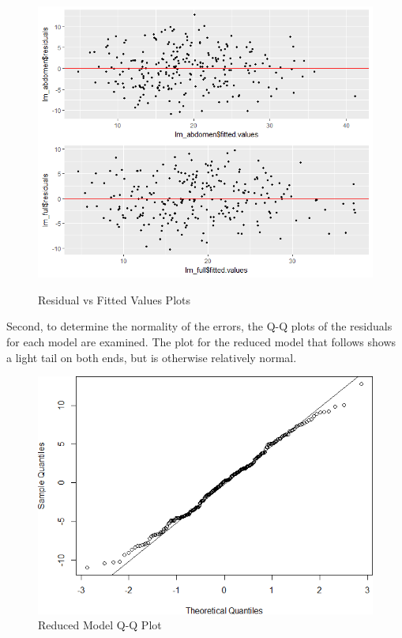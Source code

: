 \documentclass[a4paper, 11pt]{article}
\begin{document}
\begin{figure}[H]
	\centering
	\caption{Residual vs Fitted Values Plots}
	\includegraphics[width=\textwidth]{residuals_vs_fitted.png}
	\label{figure:residuals}
\end{figure}

Second, to determine the normality of the errors, the Q-Q plots of the residuals for each model are examined. The plot for the reduced model that follows shows a light tail on both ends, but is otherwise relatively normal.

\begin{figure}[H]
	\centering
	\caption{Reduced Model Q-Q Plot}
	\includegraphics[width=\textwidth]{reduced_qq_plot.png}
\end{figure}
\end{document}
